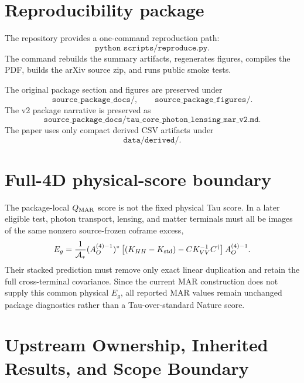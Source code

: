 \documentclass[12pt]{article}
\begin{document}
\section{Reproducibility package}

The repository provides a one-command reproduction path:
\[
  \texttt{python scripts/reproduce.py}.
\]
The command rebuilds the summary artifacts, regenerates figures, compiles the
PDF, builds the arXiv source zip, and runs public smoke tests.

The original package section and figures are preserved under
\[
  \texttt{source\_package\_docs/},\qquad
  \texttt{source\_package\_figures/}.
\]
The v2 package narrative is preserved as
\[
  \texttt{source\_package\_docs/tau\_core\_photon\_lensing\_mar\_v2.md}.
\]
The paper uses only compact derived CSV artifacts under
\[
  \texttt{data/derived/}.
\]

\section{Full-4D physical-score boundary}

The package-local $Q_{\rm MAR}$ score is not the fixed physical Tau score.
In a later eligible test, photon transport, lensing, and matter terminals must
all be images of the same nonzero source-frozen coframe excess,
\[
 E_g=\frac{1}{\mathcal A_*}(A_O^{(4)-1})^*
 \left[(K_{HH}-K_{\rm std})-CK_{VV}^{-1}C^\dagger\right]
 A_O^{(4)-1}.
\]
Their stacked prediction must remove only exact linear duplication and retain
the full cross-terminal covariance.  Since the current MAR construction does
not supply this common physical $E_g$, all reported MAR values remain
unchanged package diagnostics rather than a Tau-over-standard Nature score.

\section{Upstream Ownership, Inherited Results, and Scope Boundary}
\label{sec:upstream-ownership}
\end{document}
